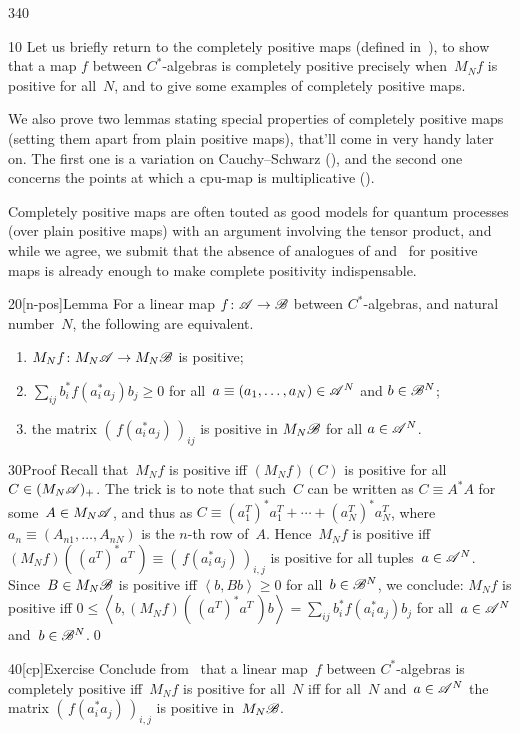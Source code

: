 \begin{parsec}{340}%
\begin{point}{10}%
Let us briefly return
to the completely positive maps (defined in~),
to show that a map $f$ between $C^*$-algebras
is completely positive precisely
when~$M_Nf$ is positive for all~$N$,
and to give some examples of completely positive maps.

We also prove two lemmas
stating special properties of completely positive maps (setting
them apart from plain positive maps),
that'll come in very handy later on.
The first one is a variation on Cauchy--Schwarz
(),
and the second one concerns
the points at which a cpu-map is multiplicative ().

Completely positive maps are often touted as 
good models for quantum processes
(over plain positive maps)
with an argument involving the tensor product,
and while we agree,
we submit that the absence of analogues of  and~
for positive maps
is already enough to make complete positivity indispensable.
\end{point}
\begin{point}{20}[n-pos]{Lemma}%
For a linear map $f\colon \mathscr{A}\to\mathscr{B}$
between $C^*$-algebras,
and natural number~$N$,
the following are equivalent.
\begin{enumerate}
\item
\label{n-pos-1}
$M_Nf\colon M_N\mathscr{A}\to M_N\mathscr{B}$
is positive;
\item
\label{n-pos-2}
	$\sum_{ij} b^*_if(a^*_ia_j)b_j \geq 0$
	for all~$a\equiv(a_1,\dotsc,a_N)\in \mathscr{A}^N$
	and $b\in \mathscr{B}^N$;
\item
\label{n-pos-3}
the matrix $(\,f(a_i^*a_j)\,)_{ij}$
is positive in $M_N\mathscr{B}$ for all $a\in\mathscr{A}^N$.
\end{enumerate}
\spacingfix%
\begin{point}{30}{Proof}%
Recall that~$M_Nf$ is positive
iff $(M_Nf)(C)$ is positive for all $C\in (M_N\mathscr{A})_{+}$.
The trick is to note that such~$C$ can be written as $C\equiv A^*A$
for some~$A\in M_N\mathscr{A}$,
and thus as $C \equiv (a_1^T)^* a_1^T+\dotsb+(a_N^T)^*a_N^T$,
where $a_n\equiv(A_{n1},\dotsc,A_{nN})$ is the $n$-th row of~$A$.
Hence~$M_Nf$ is positive
iff $(M_Nf)(\,(a^T)^*a^T\, )\equiv(\,f(a_i^*a_j)\,)_{i,j}$ is positive
for all tuples~$a\in\mathscr{A}^N$.
Since~$B\in M_N\mathscr{B}$ is positive iff $\left<b,Bb\right>\geq 0$
for all~$b\in \mathscr{B}^N$,
we conclude:
$M_Nf$ is positive iff 
$0\leq\left<b,(M_Nf)(\, (a^T)^*a^T\,) b\right>
= \sum_{ij} b_i^*f(a_i^*a_j)b_j$
for all~$a\in\mathscr{A}^N$ and~$b\in\mathscr{B}^N$.\qed
\end{point}
\end{point}
\begin{point}{40}[cp]{Exercise}%
Conclude from~
that a linear map~$f$ between $C^*$-algebras
is completely positive iff~$M_Nf$ is positive for all~$N$
iff 
for all~$N$ and~$a\in \mathscr{A}^N$
the matrix $(\,f(a_i^*a_j)\,)_{i,j}$ 
is positive in~$M_N\mathscr{B}$.


\end{point}
\end{parsec}
